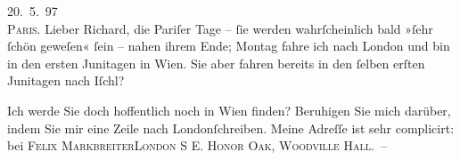 \pstart
           \raggedleft{}{\pb}20. 5. 97{\\}\textsc{Paris}.\pend
           \vspace{0.5em}
\pstart
           Lieber Richard, die Pariſer Tage
               –{ }ſie werden wahrſcheinlich bald »ſehr{ }ſchön geweſen«{ }ſein – nahen ihrem Ende; Montag
               fahre ich nach London und bin in den ersten
               Junitagen in Wien. Sie aber fahren bereits in den{ }ſelben erſten Junitagen nach Iſchl?\pend
           
\pstart
           Ich werde Sie doch hoffentlich noch in Wien
               finden? Beruhigen {\pb}Sie mich darüber, indem Sie mir
               eine Zeile nach Londonſchreiben. Meine Adreſſe ist sehr complicirt: bei
                  \textsc{Felix MarkbreiterLondon S E. Honor Oak, Woodville Hall}. –\pend
           
